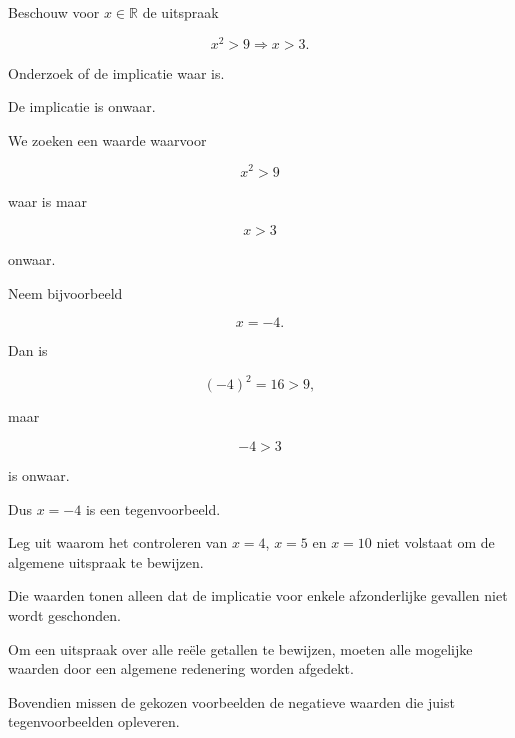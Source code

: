 \documentclass{ximera}
\begin{document}
\begin{oefening}{\oefU\ESS}

Beschouw voor $x\in\mathbb{R}$ de uitspraak

\[
x^2>9\Rightarrow x>3.
\]

\begin{question}

Onderzoek of de implicatie waar is.

\begin{oplossing}

De implicatie is onwaar.

We zoeken een waarde waarvoor

\[
x^2>9
\]

waar is maar

\[
x>3
\]

onwaar.

Neem bijvoorbeeld

\[
x=-4.
\]

Dan is

\[
(-4)^2=16>9,
\]

maar

\[
-4>3
\]

is onwaar.

Dus $x=-4$ is een tegenvoorbeeld.

\end{oplossing}

\end{question}

\begin{question}

Leg uit waarom het controleren van $x=4$, $x=5$ en $x=10$
niet volstaat om de algemene uitspraak te bewijzen.

\begin{oplossing}

Die waarden tonen alleen dat de implicatie voor enkele afzonderlijke
gevallen niet wordt geschonden.

Om een uitspraak over alle reële getallen te bewijzen, moeten alle
mogelijke waarden door een algemene redenering worden afgedekt.

Bovendien missen de gekozen voorbeelden de negatieve waarden die juist
tegenvoorbeelden opleveren.

\end{oplossing}

\end{question}

\end{oefening}
\end{document}
